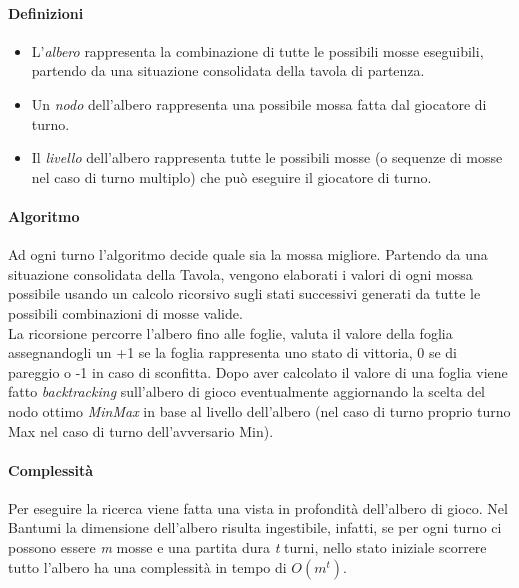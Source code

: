 \documentclass[paper=a4, fontsize=11pt]{scrartcl}	%
\numberwithin{equation}{section}															%
\numberwithin{figure}{section}																%
\numberwithin{table}{section}																%
\begin{document}
\paragraph{Definizioni}
\begin{itemize}
\item L'\textit{albero} rappresenta la combinazione di tutte le possibili mosse eseguibili, partendo da una situazione consolidata della tavola di partenza.
\item Un \textit{nodo} dell'albero rappresenta una possibile mossa fatta dal giocatore di turno.
\item Il \textit{livello} dell'albero rappresenta tutte le possibili mosse (o sequenze di mosse nel caso di turno multiplo) che pu\`o eseguire il giocatore di turno.
\end{itemize}

\paragraph{Algoritmo}
Ad ogni turno l'algoritmo decide quale sia la mossa migliore. Partendo da una situazione consolidata della Tavola, vengono elaborati i valori di ogni mossa possibile usando un calcolo ricorsivo sugli stati successivi generati da tutte le possibili combinazioni di mosse valide.\\
La ricorsione percorre l'albero fino alle foglie, valuta il valore della foglia assegnandogli un +1 se la foglia rappresenta uno stato di vittoria, 0 se di pareggio o -1 in caso di sconfitta. 
Dopo aver calcolato il valore di una foglia viene fatto \textit{ backtracking} sull'albero di gioco eventualmente aggiornando la scelta del nodo ottimo \textit{ MinMax} in base al livello dell'albero (nel caso di turno proprio turno Max nel caso di turno dell'avversario Min).

\paragraph{Complessit\`a}
Per eseguire la ricerca viene fatta una vista in profondit\`a dell'albero di gioco. Nel Bantumi la dimensione dell'albero risulta ingestibile, infatti, se per ogni turno ci possono essere \textit{ m} mosse e una partita dura \textit{ t} turni, nello stato iniziale scorrere tutto l'albero ha una complessit\`a in tempo di $O(m^t)$.
\end{document}

